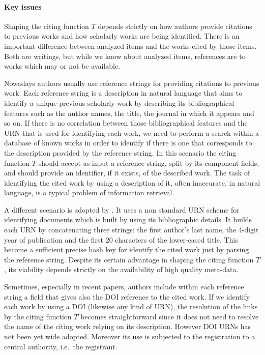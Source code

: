 \paragraph{Key issues}\label{sec:citation_graph_urn} Shaping the citing function $T$ depends strictly on how authors provide citations to previous works and how scholarly works are being identified. There is an important difference between analyzed items and the works cited by those items. Both are writings, but while we know about analyzed items, references are to works which may or not be available.

Nowadays authors usually use reference strings for providing citations to previous work. Each reference string is a description in natural language that aims to identify a unique previous scholarly work by describing its bibliographical features such as the author names, the title, the journal in which it appears and so on. If there is no correlation between those bibliographical features and the URN that is used for identifying each work, we need to perform a search within a database of known works in order to identify if there is one that corresponds to the description provided by the reference string. In this scenario the citing function $T$ should accept as input a reference string, split by its component fields, and should provide an identifier, if it exists, of the described work. The task of identifying the cited work by using a description of it, often inaccurate, in natural language, is a typical problem of information retrieval.

A different scenario is adopted by \cite{bergmark2000aer}. It uses a non standard URN scheme for identifying documents which is built by using its bibliographic details. It builds each URN by concatenating three strings: the first author's last name, the 4-digit year of publication and the first 20 characters of the lower-cased title. This become a sufficient precise hash key for identify the cited work just by parsing the reference string. Despite its certain advantage in shaping the citing function $T$, its viability depends strictly on the availability of high quality meta-data.

Sometimes, especially in recent papers, authors include within each reference string a field that gives also the DOI reference to the cited work. If we identify each work by using a DOI (likewise any kind of URN), the resolution of the links by the citing function $T$ becomes straightforward since it does not need to resolve the name of the citing work relying on its description. However DOI URNs has not been yet wide adopted. Moreover its use is subjected to the registration to a central authority, i.e.\ the registrant.

